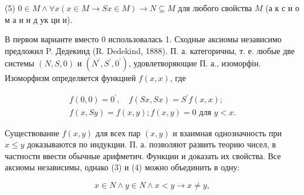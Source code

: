 \documentclass[10pt]{article}
\begin{document}
(5) $0 \in M \wedge \forall x(x \in M \longrightarrow S x \in M) \longrightarrow N \subseteq M$ для любого свойства $M$ (а к с и о м а и н д ук ци и).

В первом варианте вместо 0 использовалась 1. Сходные аксиомы независимо предложил P. Дедекинд (R. Dedekind, 1888). П. а. категоричны, т. е. любые две системы $(N, S, 0)$ и $\left(N^{\prime}, S^{\prime}, 0^{\prime}\right)$, удовлетворяющие П. а., изоморфін. Изоморфизм определяется функцией $f(x, x)$, где

\[
\begin{gathered}
f(0,0)=0^{\prime}, \quad f(S x, S x)=S^{\prime} f(x, x) ; \\
f(x, S y)=f(x, y) ; f(x, y)=0 \text { для } y<x .
\end{gathered}
\]

Существование $f(x, y)$ для всех пар $(x, y)$ и взаимная однозначность при $x \leqslant y$ доказываются по индукции. П. а. позволяют развить теорию чисел, в частности ввести обычные арифметич. Функции и доказать их свойства. Все аксиомы независимы, однако (3) и (4) можно объединить в одну:

\[
x \in N \wedge y \in N \wedge x<y \rightarrow x \neq y,
\]
\end{document}

